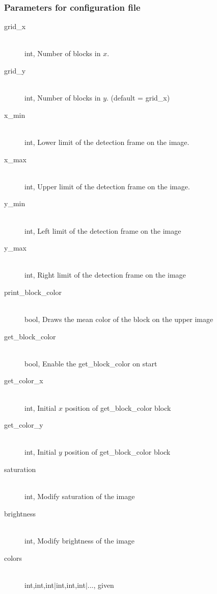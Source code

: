     \subsubsection{Parameters for configuration file}
    \label{sec:md:howto:params}
        \begin{description}
            \item[grid\_x] \hfill \\ int, Number of blocks in $x$.
            \item[grid\_y] \hfill \\ int,  Number of blocks in $y$. 
                (default = grid\_x)
            \item[x\_min] \hfill \\ int, Lower limit of the detection 
                frame on the image.
            \item[x\_max] \hfill \\ int, Upper limit of the detection 
                frame on the image.
            \item[y\_min] \hfill \\ int, Left limit of the detection frame 
                on the image
            \item[y\_max] \hfill \\ int, Right limit of the detection 
                frame on the image
            \item[print\_block\_color] \hfill \\ bool, Draws the mean 
                color of the block on the upper image
            \item[get\_block\_color] \hfill \\ bool, Enable the 
                get\_block\_color on start
            \item[get\_color\_x] \hfill \\ int,  Initial $x$ position of 
                get\_block\_color block
            \item[get\_color\_y] \hfill \\ int,  Initial $y$ position of 
                get\_block\_color block
            \item[saturation] \hfill \\ int,  Modify saturation of the 
                image
            \item[brightness] \hfill \\ int,  Modify brightness of the 
                image
            \item[colors] \hfill \\ int,int,int$|$int,int,int$|$..., given 

\end{description}
